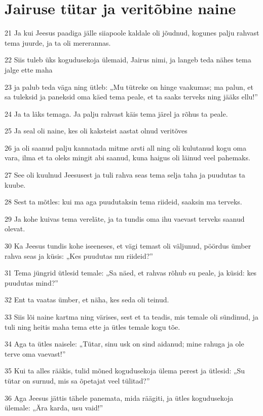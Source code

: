 \section*{Jairuse tütar ja veritõbine naine}

\par 21 Ja kui Jeesus paadiga jälle siiapoole kaldale oli jõudnud, kogunes palju rahvast tema juurde, ja ta oli mererannas.
\par 22 Siis tuleb üks kogudusekoja ülemaid, Jairus nimi, ja langeb teda nähes tema jalge ette maha
\par 23 ja palub teda väga ning ütleb: „Mu tütreke on hinge vaakumas; ma palun, et sa tuleksid ja paneksid oma käed tema peale, et ta saaks terveks ning jääks ellu!”
\par 24 Ja ta läks temaga. Ja palju rahvast käis tema järel ja rõhus ta peale.
\par 25 Ja seal oli naine, kes oli kaksteist aastat olnud veritõves
\par 26 ja oli saanud palju kannatada mitme arsti all ning oli kulutanud kogu oma vara, ilma et ta oleks mingit abi saanud, kuna haigus oli läinud veel pahemaks.
\par 27 See oli kuulnud Jeesusest ja tuli rahva seas tema selja taha ja puudutas ta kuube.
\par 28 Sest ta mõtles: kui ma aga puudutaksin tema riideid, saaksin ma terveks.
\par 29 Ja kohe kuivas tema vereläte, ja ta tundis oma ihu vaevast terveks saanud olevat.
\par 30 Ka Jeesus tundis kohe iseeneses, et vägi temast oli väljunud, pöördus ümber rahva seas ja küsis: „Kes puudutas mu riideid?”
\par 31 Tema jüngrid ütlesid temale: „Sa näed, et rahvas rõhub su peale, ja küsid: kes puudutas mind?”
\par 32 Ent ta vaatas ümber, et näha, kes seda oli teinud.
\par 33 Siis lõi naine kartma ning värises, sest et ta teadis, mis temale oli sündinud, ja tuli ning heitis maha tema ette ja ütles temale kogu tõe.
\par 34 Aga ta ütles naisele: „Tütar, sinu usk on sind aidanud; mine rahuga ja ole terve oma vaevast!”
\par 35 Kui ta alles rääkis, tulid mõned kogudusekoja ülema perest ja ütlesid: „Su tütar on surnud, mis sa õpetajat veel tülitad?”
\par 36 Aga Jeesus jättis tähele panemata, mida räägiti, ja ütles kogudusekoja ülemale: „Ära karda, usu vaid!”
